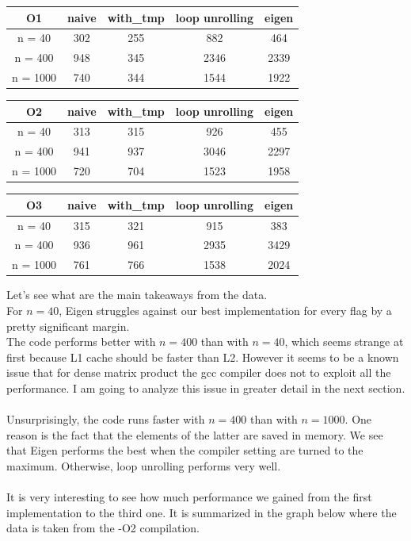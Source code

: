 \documentclass[11pt,a4paper,oneside,titlepage,openright]{book}
\begin{document}
\begin{center}
 \begin{tabular}{|c c c c c |} 
 \hline
 O1 & naive & with\_tmp & loop unrolling & eigen \\ [0.5ex] 
 \hline
 n = 40 & 302 &  255 & 882  & 464\\ 
 \hline
 n = 400 & 948 & 345 & 2346 & 2339\\
 \hline
 n = 1000 & 740 & 344 & 1544 & 1922\\
 \hline
\end{tabular}
\end{center}

\begin{center}
 \begin{tabular}{|c c c c c |} 
 \hline
 O2 & naive & with\_tmp & loop unrolling & eigen \\ [0.5ex] 
 \hline
 n = 40 & 313 & 315 & 926  & 455\\ 
 \hline
 n = 400 & 941 & 937 & 3046 & 2297\\
 \hline
 n = 1000 & 720 & 704 & 1523 & 1958\\
 \hline
\end{tabular}
\end{center}

\begin{center}
 \begin{tabular}{|c c c c c |} 
 \hline
 O3 & naive & with\_tmp & loop unrolling & eigen \\ [0.5ex] 
 \hline
 n = 40 & 315 & 321 & 915  & 383\\ 
 \hline
 n = 400 & 936 & 961 & 2935 & 3429\\
 \hline
 n = 1000 & 761 & 766 & 1538 & 2024\\
 \hline
\end{tabular}
\end{center}
Let's see what are the main takeaways from the data.\\
For $n = 40$, Eigen struggles against our best implementation for every flag by a pretty significant margin. \\
The code performs better with $n = 400$ than with $n = 40$, which seems strange at first because L1 cache should be faster than L2. However it seems to be a known issue that for dense matrix product the gcc compiler does not to exploit all the performance. I am going to analyze this issue in greater detail in the next section.\\\\
Unsurprisingly, the code runs faster with $n = 400$ than with $n = 1000$. One reason is the fact that the elements of the latter are saved in memory. 
We see that Eigen performs the best when the compiler setting are turned to the maximum. Otherwise, loop unrolling performs very well.\\\\ 
It is very interesting to see how much performance we gained from the first implementation to the third one. It is summarized in the graph below where the data is taken from the -O2 compilation.
\end{document}
